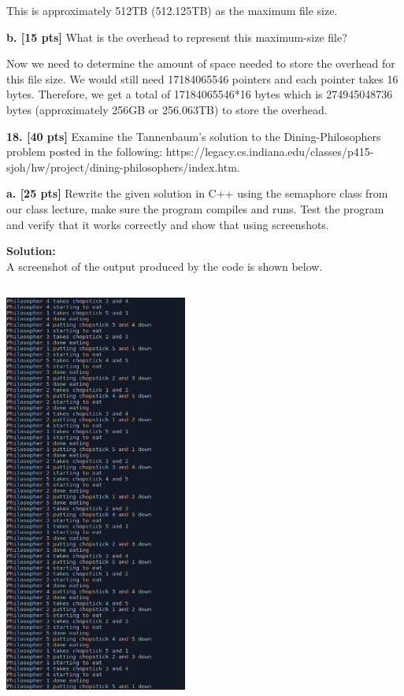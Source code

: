 \documentclass[12pt]{article}
\begin{document}
This is approximately 512TB (512.125TB) as the maximum file size. 

{\bf b. [15 pts]} What is the overhead to represent this maximum-size file?

Now we need to determine the amount of space needed to store the overhead for this file size. We would still need 17184065546 pointers and each pointer takes 16 bytes. Therefore, we get a total of 17184065546*16 bytes which is 274945048736 bytes (approximately 256GB or 256.063TB) to store the overhead. 

{\bf 18. [40 pts]} Examine the Tannenbaum’s solution to the Dining-Philosophers problem posted in the following: https://legacy.cs.indiana.edu/classes/p415-sjoh/hw/project/dining-philosophers/index.htm.

{\bf a. [25 pts]} Rewrite the given solution in C++ using the semaphore class from our class lecture, make sure the program compiles and runs. Test the program and verify that it works correctly and show that using screenshots.

{\bf Solution:}\\

A screenshot of the output produced by the code is shown below. 

\begin{center}
\includegraphics[width=6cm, height=14cm]{q18Output}
\end{center}
\end{document}
